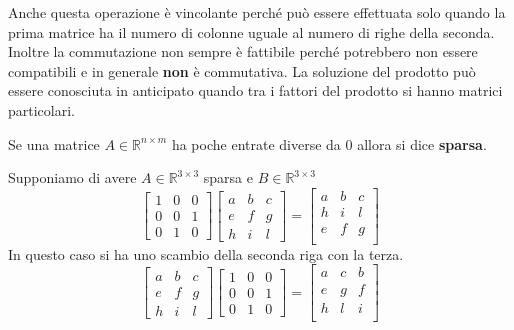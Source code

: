 Anche questa operazione è vincolante perché può essere effettuata solo quando la
prima matrice ha il numero di colonne uguale al numero di righe della seconda.
Inoltre la commutazione non sempre è fattibile perché potrebbero non essere
compatibili e in generale \textbf{non} è commutativa. La soluzione del prodotto
può essere conosciuta in anticipato quando tra i fattori del prodotto si hanno
matrici particolari.
\begin{definizione}
    Se una matrice $A\in \mathbb{R}^{n \times m}$ ha poche entrate diverse da $0$
    allora si dice \textbf{sparsa}.
\end{definizione}

Supponiamo di avere $A\in \mathbb{R}^{3\times 3}$ sparsa e $B\in \mathbb{R}^{3\times3}$
\begin{equation*}
    \left[\begin{array}{ccc}
            1 & 0 & 0 \\
            0 & 0 & 1 \\
            0 & 1 & 0
        \end{array}\right]  \left[\begin{array}{ccc}
            a & b & c \\
            e & f & g \\
            h & i & l
        \end{array}\right] = \left[\begin{array}{ccc}
            a & b & c \\
            h & i & l \\
            e & f & g \\
        \end{array}\right]
\end{equation*}
In questo caso si ha uno scambio della seconda riga con la terza.
\begin{equation*}
    \left[\begin{array}{ccc}
            a & b & c \\
            e & f & g \\
            h & i & l
        \end{array}\right] \left[\begin{array}{ccc}
            1 & 0 & 0 \\
            0 & 0 & 1 \\
            0 & 1 & 0
        \end{array}\right] = \left[\begin{array}{ccc}
            a & c & b \\
            e & g & f \\
            h & l & i \\
        \end{array}\right]
\end{equation*}
